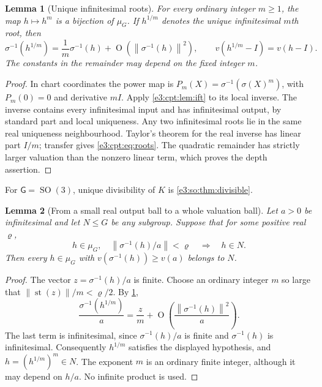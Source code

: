 \documentclass[11pt,letterpaper]{article}
\numberwithin{equation}{section}
\newtheorem{lemma}[lemma]{Lemma}
\theoremstyle{definition}
\theoremstyle{remark}
\newcommand{\st}{\operatorname{st}}
\newcommand{\SO}{\operatorname{SO}}
\newcommand{\norm}[1]{\left\lVert#1\right\rVert}
\newcommand{\smallO}{\operatorname{O}}
\newcommand{\sG}{\mathsf G}
\begin{document}
\begin{lemma}[Unique infinitesimal roots]\label{e3:cpt:lem:roots}
For every ordinary integer $m\ge1$, the map $h\mapsto h^m$ is a bijection of
$\mu_G$. If $h^{1/m}$ denotes the unique infinitesimal $m$th root, then
\begin{equation}\label{e3:cpt:eq:roots}
 \sigma^{-1}(h^{1/m})=\frac1m\sigma^{-1}(h)+\smallO(\norm{\sigma^{-1}(h)}^2),
 \qquad v(h^{1/m}-I)=v(h-I).
\end{equation}
The constants in the remainder may depend on the fixed integer $m$.
\end{lemma}
\begin{proof}
In chart coordinates the power map is $P_m(X)=\sigma^{-1}(\sigma(X)^m)$, with
$P_m(0)=0$ and derivative $mI$. Apply \cref{e3:cpt:lem:ift} to its local
inverse. The inverse contains every infinitesimal input and has infinitesimal
output, by standard part and local uniqueness. Any two infinitesimal roots lie
in the same real uniqueness neighbourhood. Taylor's theorem for the real inverse
has linear part $I/m$; transfer gives \cref{e3:cpt:eq:roots}. The quadratic
remainder has strictly larger valuation than the nonzero linear term, which
proves the depth assertion.
\end{proof}

For $\sG=\SO(3)$, unique divisibility of $K$ is \cref{e3:so:thm:divisible}.

\begin{lemma}[From a small real output ball to a whole valuation ball]\label{e3:cpt:lem:amplify}
Let $a>0$ be infinitesimal and let $N\le G$ be any subgroup. Suppose that for
some positive real $\varrho$,
\[
 h\in\mu_G,\quad \norm{\sigma^{-1}(h)/a}<\varrho\quad\Longrightarrow\quad h\in N.
\]
Then every $h\in\mu_G$ with $v(\sigma^{-1}(h))\ge v(a)$ belongs to $N$.
\end{lemma}
\begin{proof}
The vector $z=\sigma^{-1}(h)/a$ is finite. Choose an ordinary integer $m$ so
large that $\norm{\st(z)}/m<\varrho/2$. By \cref{e3:cpt:lem:roots},
\[
 \frac{\sigma^{-1}(h^{1/m})}{a}=\frac{z}{m}
 +\smallO\!\left(\frac{\norm{\sigma^{-1}(h)}^2}{a}\right).
\]
The last term is infinitesimal, since $\sigma^{-1}(h)/a$ is finite and
$\sigma^{-1}(h)$ is infinitesimal. Consequently $h^{1/m}$ satisfies the
displayed hypothesis, and $h=(h^{1/m})^m\in N$. The exponent $m$ is an ordinary
finite integer, although it may depend on $h/a$. No infinite product is used.
\end{proof}
\end{document}
